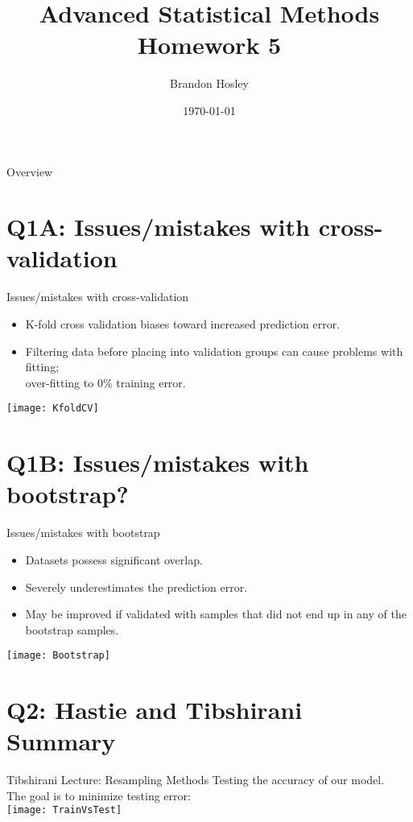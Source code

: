 \documentclass{beamer}
\title{Advanced Statistical Methods \\ Homework 5}
\author{Brandon Hosley}
\institute{University of Illinois - Springfield}
\date{\today}
\begin{document}
\frame{\titlepage}

\begin{frame}{Overview}
\tableofcontents
\end{frame}

\section[Q1A]{Q1A: Issues/mistakes with cross-validation}

\begin{frame}{Issues/mistakes with cross-validation}
	\begin{itemize}[<+->]
		\item K-fold cross validation biases toward increased prediction error.
		\item Filtering data before placing into validation groups can cause problems with fitting; \\ over-fitting to 0\% training error.
	\end{itemize}
	\vspace{1em}
	\centering 
	\texttt{[image: KfoldCV]}
	\vspace{1em}
\end{frame}

\section[Q1B]{Q1B: Issues/mistakes with bootstrap?}
\begin{frame}{Issues/mistakes with bootstrap}
	\begin{itemize}[<+->]
		\item Datasets possess significant overlap.
		\item Severely underestimates the prediction error.
		\item May be improved if validated with samples that did not end up in any of the bootstrap samples.
	\end{itemize}
	\vspace{1em}
	\centering 
	\texttt{[image: Bootstrap]}
	\vspace{1em}
\end{frame}

\section[Q2]{Q2: Hastie and Tibshirani Summary}

\begin{frame}{Tibshirani Lecture: Resampling Methods}
	Testing the accuracy of our model. \\
	The goal is to minimize testing error: \\
	\vspace{1em}
	\centering 
	\texttt{[image: TrainVsTest]}
	\vspace{1em}
\end{frame}
\end{document}

